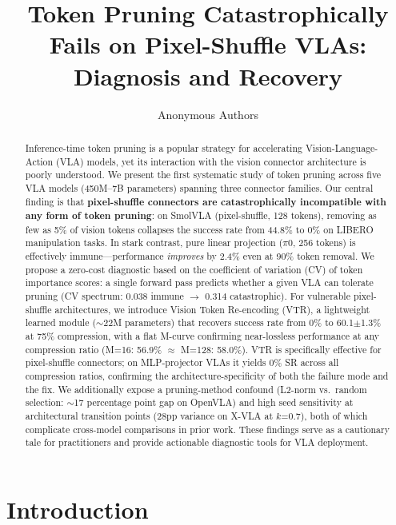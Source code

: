\documentclass[letterpaper]{article}
\title{Token Pruning Catastrophically Fails on Pixel-Shuffle VLAs:\\ Diagnosis and Recovery}
\author{
Anonymous Authors
}
\date{}
\begin{document}
\maketitle

\begin{abstract}
Inference-time token pruning is a popular strategy for accelerating Vision-Language-Action (VLA) models, yet its interaction with the vision connector architecture is poorly understood.
We present the first systematic study of token pruning across five VLA models (450M--7B parameters) spanning three connector families.
Our central finding is that \textbf{pixel-shuffle connectors are catastrophically incompatible with any form of token pruning}: on SmolVLA (pixel-shuffle, 128 tokens), removing as few as 5\% of vision tokens collapses the success rate from 44.8\% to 0\% on LIBERO manipulation tasks.
In stark contrast, pure linear projection ($\pi$0, 256 tokens) is effectively immune---performance \emph{improves} by 2.4\% even at 90\% token removal.
We propose a zero-cost diagnostic based on the coefficient of variation (CV) of token importance scores: a single forward pass predicts whether a given VLA can tolerate pruning (CV spectrum: 0.038 immune $\rightarrow$ 0.314 catastrophic).
For vulnerable pixel-shuffle architectures, we introduce Vision Token Re-encoding (VTR), a lightweight learned module ($\sim$22M parameters) that recovers success rate from 0\% to 60.1$\pm$1.3\% at 75\% compression, with a flat M-curve confirming near-lossless performance at any compression ratio (M=16: 56.9\% $\approx$ M=128: 58.0\%).
VTR is specifically effective for pixel-shuffle connectors; on MLP-projector VLAs it yields 0\% SR across all compression ratios, confirming the architecture-specificity of both the failure mode and the fix.
We additionally expose a pruning-method confound (L2-norm vs.\ random selection: $\sim$17 percentage point gap on OpenVLA) and high seed sensitivity at architectural transition points (28pp variance on X-VLA at $k$=0.7), both of which complicate cross-model comparisons in prior work.
These findings serve as a cautionary tale for practitioners and provide actionable diagnostic tools for VLA deployment.
\end{abstract}

\section{Introduction}
\label{sec:intro}
\end{document}
